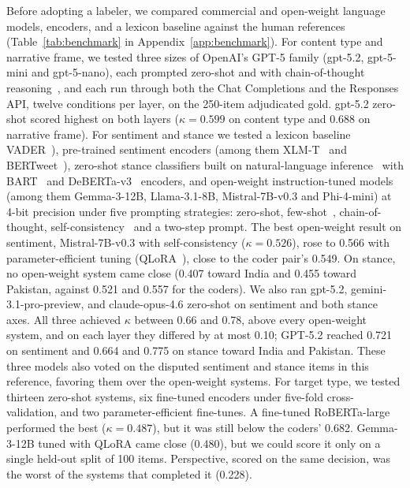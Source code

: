 Before adopting a labeler, we compared commercial and open-weight language models, encoders, and a lexicon baseline against the human references (Table~\ref{tab:benchmark} in Appendix~\ref{app:benchmark}). For content type and narrative frame, we tested three sizes of OpenAI's GPT-5 family (gpt-5.2, gpt-5-mini and gpt-5-nano), each prompted zero-shot and with chain-of-thought reasoning~\cite{wei2022chain}, and each run through both the Chat Completions and the Responses API, twelve conditions per layer, on the 250-item adjudicated gold. gpt-5.2 zero-shot scored highest on both layers ($\kappa = 0.599$ on content type and 0.688 on narrative frame). For sentiment and stance we tested a lexicon baseline VADER~\cite{hutto2014vader}), pre-trained sentiment encoders (among them XLM-T~\cite{barbieri2022xlmt} and BERTweet~\cite{nguyen2020bertweet}), zero-shot stance classifiers built on natural-language inference~\cite{yin2019benchmarking} with BART~\cite{lewis2020bart} and DeBERTa-v3~\cite{he2023debertav3,laurer2024less} encoders, and open-weight instruction-tuned models (among them Gemma-3-12B, Llama-3.1-8B, Mistral-7B-v0.3 and Phi-4-mini) at 4-bit precision under five prompting strategies: zero-shot, few-shot~\cite{brown2020language}, chain-of-thought, self-consistency~\cite{wang2023selfconsistency} and a two-step prompt. The best open-weight result on sentiment, Mistral-7B-v0.3 with self-consistency ($\kappa = 0.526$), rose to 0.566 with parameter-efficient tuning (QLoRA~\cite{dettmers2023qlora}), close to the coder pair's 0.549. On stance, no open-weight system came close (0.407 toward India and 0.455 toward Pakistan, against 0.521 and 0.557 for the coders). We also ran gpt-5.2, gemini-3.1-pro-preview, and claude-opus-4.6 zero-shot on sentiment and both stance axes. All three achieved $\kappa$ between 0.66 and 0.78, above every open-weight system, and on each layer they differed by at most 0.10; GPT-5.2 reached 0.721 on sentiment and 0.664 and 0.775 on stance toward India and Pakistan. These three models also voted on the disputed sentiment and stance items in this reference, favoring them over the open-weight systems. For target type, we tested thirteen zero-shot systems, six fine-tuned encoders under five-fold cross-validation, and two parameter-efficient fine-tunes. A fine-tuned RoBERTa-large performed the best ($\kappa = 0.487$), but it was still below the coders' 0.682. Gemma-3-12B tuned with QLoRA came close (0.480), but we could score it only on a single held-out split of 100 items. Perspective, scored on the same decision, was the worst of the systems that completed it (0.228).


